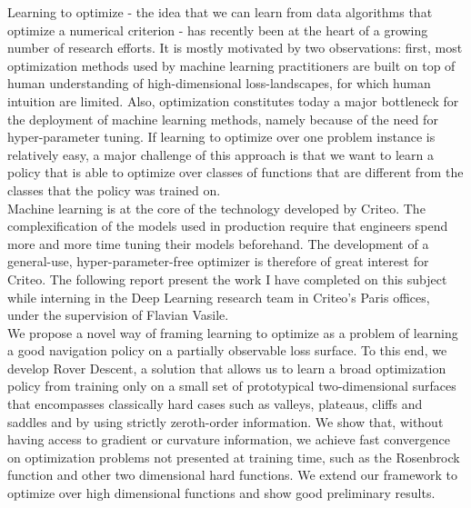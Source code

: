 \documentclass[a4paper]{report}
\begin{document}
	
	
	\abstract
	{
		Learning to optimize - the idea that we can learn from data algorithms that optimize a numerical criterion - has recently been at the heart of a growing number of research efforts. It is mostly motivated by two observations: first, most optimization methods used by machine learning practitioners are built on top of human understanding of high-dimensional loss-landscapes, for which human intuition are limited. Also, optimization constitutes today a major bottleneck for the deployment of machine learning methods, namely because of the need for hyper-parameter tuning. If learning to optimize over one problem instance is relatively easy, a major challenge of this approach is that we want to learn a policy that is able to optimize over classes of functions that are different from the classes that the policy was trained on.
		\\
		
		Machine learning is at the core of the technology developed by Criteo. The complexification of the models used in production require that engineers spend more and more time tuning their models beforehand. The development of a general-use, hyper-parameter-free optimizer is therefore of great interest for Criteo. The following report present the work I have completed on this subject while interning in the Deep Learning research team in Criteo's Paris offices, under the supervision of Flavian Vasile. 
		\\
		
		We propose a novel way of framing learning to optimize as a problem of learning a good navigation policy on a partially observable loss surface. To this end, we develop Rover Descent, a solution that allows us to learn a broad optimization policy from training only on a small set of prototypical two-dimensional surfaces that encompasses classically hard cases such as valleys, plateaus, cliffs and saddles and by using strictly zeroth-order information. We show that, without having access to gradient or curvature information, we achieve fast convergence on optimization problems not presented at training time, such as the Rosenbrock function and other two dimensional hard functions. We extend our framework to optimize over high dimensional functions and show good preliminary results.
	} 
		
	\tableofcontents
	
	\newpage
	\begingroup
	\let\clearpage\relax
		\listoffigures
	\endgroup

	
		
	
	
	
	
	
	
	
	
	
	
	
	
	
 	 
	 
	 

	
\end{document}
